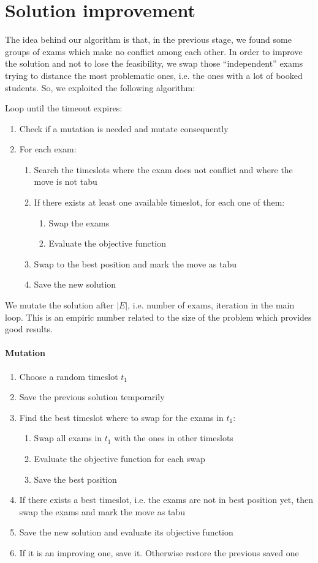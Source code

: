 \section*{Solution improvement}
The idea behind our algorithm is that, in the previous stage, we found some groups of exams which make no conflict among each other. In order to improve the solution and not to lose the feasibility, we swap those ``independent'' exams trying to distance the most problematic ones, i.e. the ones with a lot of booked students.
So, we exploited the following algorithm:

Loop until the timeout expires:
\begin{enumerate}
\item Check if a mutation is needed and mutate consequently
\item For each exam:
\begin{enumerate}
\item Search the timeslots where the exam does not conflict and where the move is not tabu
\item If there exists at least one available timeslot, for each one of them:
\begin{enumerate}
\item Swap the exams
\item Evaluate the objective function
\end{enumerate}
\item Swap to the best position and mark the move as tabu
\item Save the new solution
\end{enumerate}
\end{enumerate}
We mutate the solution after $|E|$, i.e. number of exams, iteration in the main loop. This is an empiric number related to the size of the problem which provides good results.
\paragraph*{Mutation}
\begin{enumerate}
\item Choose a random timeslot $t_1$
\item Save the previous solution temporarily
\item Find the best timeslot where to swap for the exams in $t_1$:
\begin{enumerate}
\item Swap all exams in $t_1$ with the ones in other timeslots
\item Evaluate the objective function for each swap
\item Save the best position
\end{enumerate}
\item If there exists a best timeslot, i.e. the exams are not in best position yet, then swap the exams and mark the move as tabu
\item Save the new solution and evaluate its objective function
\item If it is an improving one, save it. Otherwise restore the previous saved one
\end{enumerate}